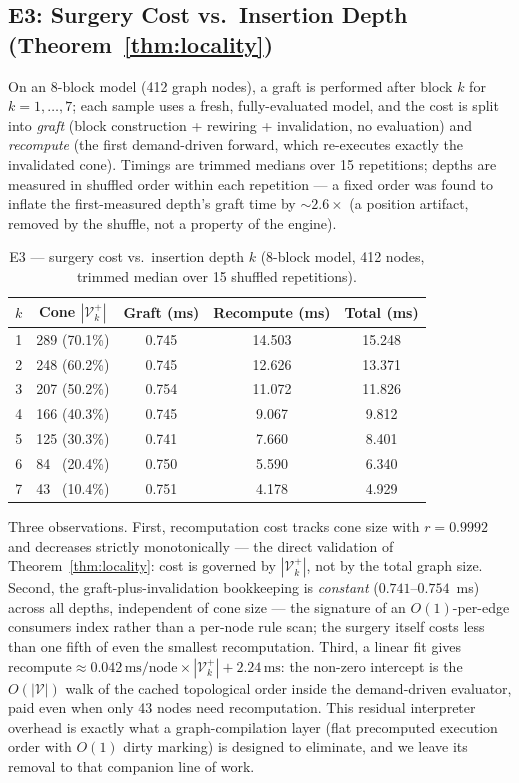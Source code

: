 \documentclass[11pt,a4paper]{article}
\newcommand{\V}{\mathcal{V}}
\begin{document}
\subsection{E3: Surgery Cost vs.\ Insertion Depth (Theorem~\ref{thm:locality})}

On an 8-block model (412 graph nodes), a graft is performed after block $k$ for $k = 1, \dots, 7$; each sample uses a fresh, fully-evaluated model, and the cost is split into \emph{graft} (block construction + rewiring + invalidation, no evaluation) and \emph{recompute} (the first demand-driven forward, which re-executes exactly the invalidated cone). Timings are trimmed medians over 15 repetitions; depths are measured in shuffled order within each repetition --- a fixed order was found to inflate the first-measured depth's graft time by $\sim 2.6\times$ (a position artifact, removed by the shuffle, not a property of the engine).

\begin{table}[htbp]
\centering
\caption{E3 --- surgery cost vs.\ insertion depth $k$ (8-block model, 412 nodes, trimmed median over 15 shuffled repetitions).}
\label{tab:e3}
\begin{tabular}{c c c c c}
\toprule
$k$ & \textbf{Cone} $|\V_k^{+}|$ & \textbf{Graft (ms)} & \textbf{Recompute (ms)} & \textbf{Total (ms)} \\
\midrule
1 & 289 (70.1\%) & 0.745 & 14.503 & 15.248 \\
2 & 248 (60.2\%) & 0.745 & 12.626 & 13.371 \\
3 & 207 (50.2\%) & 0.754 & 11.072 & 11.826 \\
4 & 166 (40.3\%) & 0.745 & 9.067  & 9.812  \\
5 & 125 (30.3\%) & 0.741 & 7.660  & 8.401  \\
6 & 84 \ (20.4\%) & 0.750 & 5.590  & 6.340  \\
7 & 43 \ (10.4\%) & 0.751 & 4.178  & 4.929  \\
\bottomrule
\end{tabular}
\end{table}

Three observations. First, recomputation cost tracks cone size with $r = 0.9992$ and decreases strictly monotonically --- the direct validation of Theorem~\ref{thm:locality}: cost is governed by $|\V_k^{+}|$, not by the total graph size. Second, the graft-plus-invalidation bookkeeping is \emph{constant} ($0.741$--$0.754$~ms) across all depths, independent of cone size --- the signature of an $O(1)$-per-edge consumers index rather than a per-node rule scan; the surgery itself costs less than one fifth of even the smallest recomputation. Third, a linear fit gives $\text{recompute} \approx 0.042\,\text{ms/node} \times |\V_k^{+}| + 2.24\,\text{ms}$: the non-zero intercept is the $O(|\V|)$ walk of the cached topological order inside the demand-driven evaluator, paid even when only 43 nodes need recomputation. This residual interpreter overhead is exactly what a graph-compilation layer (flat precomputed execution order with $O(1)$ dirty marking) is designed to eliminate, and we leave its removal to that companion line of work.
\end{document}
